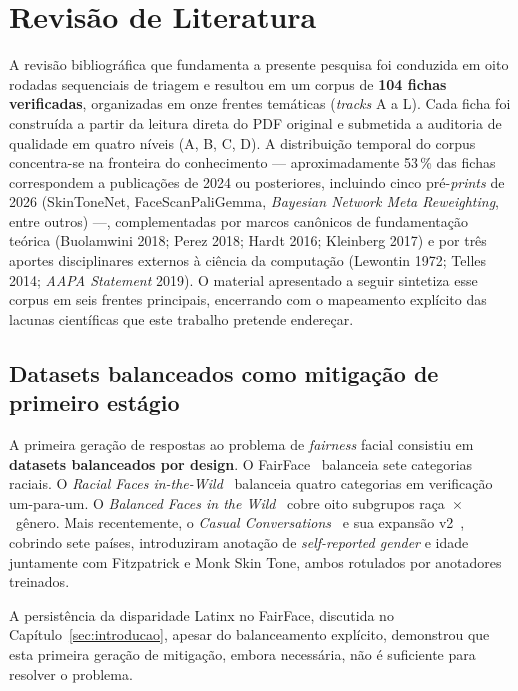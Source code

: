 \section{Revisão de Literatura}
\label{sec:rl}

A revisão bibliográfica que fundamenta a presente pesquisa foi conduzida em oito rodadas sequenciais de triagem e resultou em um corpus de \textbf{104 fichas verificadas}, organizadas em onze frentes temáticas (\emph{tracks} A a L). Cada ficha foi construída a partir da leitura direta do PDF original e submetida a auditoria de qualidade em quatro níveis (A, B, C, D). A distribuição temporal do corpus concentra-se na fronteira do conhecimento --- aproximadamente 53\,\% das fichas correspondem a publicações de 2024 ou posteriores, incluindo cinco pré-\emph{prints} de 2026 (SkinToneNet, FaceScanPaliGemma, \emph{Bayesian Network Meta Reweighting}, entre outros) ---, complementadas por marcos canônicos de fundamentação teórica (Buolamwini 2018; Perez 2018; Hardt 2016; Kleinberg 2017) e por três aportes disciplinares externos à ciência da computação (Lewontin 1972; Telles 2014; \emph{AAPA Statement} 2019). O material apresentado a seguir sintetiza esse corpus em seis frentes principais, encerrando com o mapeamento explícito das lacunas científicas que este trabalho pretende endereçar.

\subsection{Datasets balanceados como mitigação de primeiro estágio}
\label{sec:rl_datasets}

A primeira geração de respostas ao problema de \emph{fairness} facial consistiu em \textbf{datasets balanceados por design}. O FairFace~\autocite{karkkainen2021fairface} balanceia sete categorias raciais. O \emph{Racial Faces in-the-Wild}~\autocite{wang2019racial} balanceia quatro categorias em verificação um-para-um. O \emph{Balanced Faces in the Wild}~\autocite{robinson2020face} cobre oito subgrupos raça~$\times$~gênero. Mais recentemente, o \emph{Casual Conversations}~\autocite{hazirbas2021towards} e sua expansão v2~\autocite{porgali2023casual}, cobrindo sete países, introduziram anotação de \emph{self-reported gender} e idade juntamente com Fitzpatrick e Monk Skin Tone, ambos rotulados por anotadores treinados.

A persistência da disparidade Latinx no FairFace, discutida no Capítulo~\ref{sec:introducao}, apesar do balanceamento explícito, demonstrou que esta primeira geração de mitigação, embora necessária, não é suficiente para resolver o problema.

